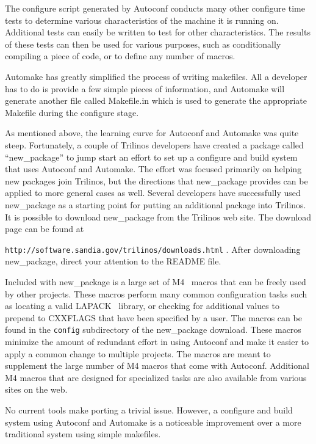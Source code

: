 \documentclass[12pt,relax]{article}
\newcommand{\InlineDirectory}[1]{
  {\hspace{0.01 in}} {\tt #1} {\hspace{0.01 in}}}
\begin{document}
The configure script generated by Autoconf conducts many other configure 
time tests to determine various 
characteristics of the machine it is running on.  Additional tests can 
easily be written to test for other characteristics.  The results of these 
tests can then be used for various purposes, such as conditionally compiling 
a piece of code, or to define any number of macros.

Automake has greatly simplified the process of writing makefiles.  All a 
developer has to do is provide a few simple pieces of information, and 
Automake will generate another file called Makefile.in which is used to 
generate the appropriate Makefile during the configure stage.

As mentioned above, the learning curve for Autoconf and Automake was quite 
steep.  Fortunately, a couple of Trilinos developers have created a package 
called ``new\_package'' to jump start an effort to set up a configure and 
build system that uses Autoconf and Automake.  The effort was focused 
primarily on helping new packages join Trilinos, but the directions that 
new\_package provides can be applied to more general cases as well.  Several
developers have successfully used new\_package as a starting point for 
putting an additional
package into Trilinos.  It is possible to download new\_package from the 
Trilinos web site.  The download page can be found at \newline 
\InlineDirectory{http://software.sandia.gov/trilinos/downloads.html}.  After
downloading new\_package, direct your attention to the README file.

Included with new\_package is a large set of M4~\cite{M4} macros that can 
be freely used by other projects.  These macros perform many common 
configuration tasks such as locating a valid LAPACK~\cite{lapack} library, 
or checking for additional values to prepend to CXXFLAGS that have been 
specified by a user.  The macros can be found in the \InlineDirectory{config}
subdirectory of the new\_package download.  These macros minimize the amount of
redundant effort in using Autoconf and make it easier to apply a common change 
to multiple projects.  The macros are meant to supplement the large number of 
M4 macros that come with Autoconf.  Additional M4 macros that are designed for 
specialized tasks are also available from various sites on the web.

No current tools make porting a trivial issue.  However, a 
configure and build system using Autoconf and Automake is a 
noticeable improvement over a more traditional system using simple makefiles.
\end{document}
